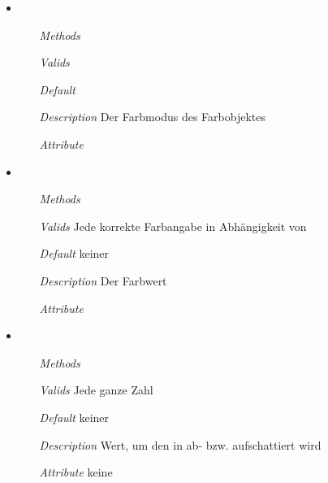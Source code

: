 \begin{itemize}
\item {}
\begin{enumerate}
\item[\textit{Methods}]
\item[\textit{Valids}] 
\item[\textit{Default}] 
\item[\textit{Description}] Der Farbmodus des Farbobjektes
\item[\textit{Attribute}] 
\end{enumerate}

\item {}
\begin{enumerate}
\item[\textit{Methods}] 
\item[\textit{Valids}] Jede korrekte Farbangabe in Abh\"angigkeit
von 
\item[\textit{Default}] keiner
\item[\textit{Description}] Der Farbwert
\item[\textit{Attribute}] 
\end{enumerate}

\item {}
\begin{enumerate}
\item[\textit{Methods}] 
\item[\textit{Valids}] Jede ganze Zahl
\item[\textit{Default}] keiner
\item[\textit{Description}] Wert, um den  in
ab- bzw. aufschattiert wird
\item[\textit{Attribute}] keine
\end{enumerate}

\end{itemize}

\newpage

